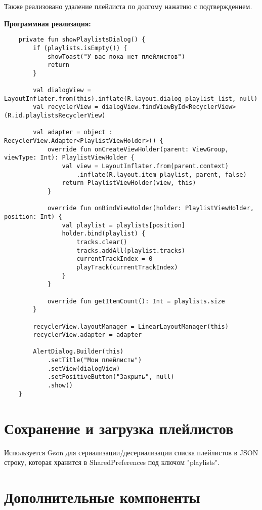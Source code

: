 Также реализовано удаление плейлиста по долгому нажатию с подтверждением.

\textbf{Программная реализация:}
\begin{verbatim}
	private fun showPlaylistsDialog() {
        if (playlists.isEmpty()) {
            showToast("У вас пока нет плейлистов")
            return
        }

        val dialogView = LayoutInflater.from(this).inflate(R.layout.dialog_playlist_list, null)
        val recyclerView = dialogView.findViewById<RecyclerView>(R.id.playlistsRecyclerView)

        val adapter = object : RecyclerView.Adapter<PlaylistViewHolder>() {
            override fun onCreateViewHolder(parent: ViewGroup, viewType: Int): PlaylistViewHolder {
                val view = LayoutInflater.from(parent.context)
                    .inflate(R.layout.item_playlist, parent, false)
                return PlaylistViewHolder(view, this)
            }

            override fun onBindViewHolder(holder: PlaylistViewHolder, position: Int) {
                val playlist = playlists[position]
                holder.bind(playlist) {
                    tracks.clear()
                    tracks.addAll(playlist.tracks)
                    currentTrackIndex = 0
                    playTrack(currentTrackIndex)
                }
            }

            override fun getItemCount(): Int = playlists.size
        }

        recyclerView.layoutManager = LinearLayoutManager(this)
        recyclerView.adapter = adapter

        AlertDialog.Builder(this)
            .setTitle("Мои плейлисты")
            .setView(dialogView)
            .setPositiveButton("Закрыть", null)
            .show()
    }
\end{verbatim}

\section{Сохранение и загрузка плейлистов}


Используется Gson для сериализации/десериализации списка плейлистов в JSON строку, которая хранится в SharedPreferences под ключом "playlists".

\section{Дополнительные компоненты}

